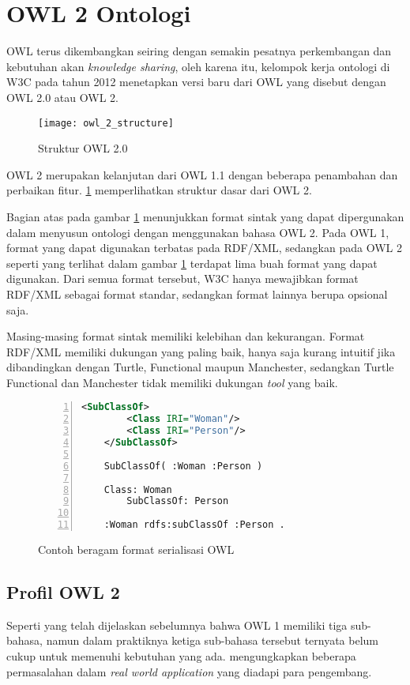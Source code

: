 \section{OWL 2 Ontologi}
OWL terus dikembangkan seiring dengan semakin pesatnya perkembangan dan kebutuhan akan \emph{knowledge sharing}, oleh karena itu, kelompok kerja ontologi di W3C pada tahun 2012 menetapkan versi baru dari OWL yang disebut dengan OWL 2.0 atau OWL 2.

\begin{figure}[ht]
	\centering
	\texttt{[image: owl\_2\_structure]}
	\caption{Struktur OWL 2.0}
	\label{fig:owl_2_structure}
\end{figure}

OWL 2 merupakan kelanjutan dari OWL 1.1 dengan beberapa penambahan dan perbaikan fitur. \ref{fig:owl_2_structure} memperlihatkan struktur dasar dari OWL 2.

Bagian atas pada gambar \ref{fig:owl_2_structure} menunjukkan format sintak yang dapat dipergunakan dalam menyusun ontologi dengan menggunakan bahasa OWL 2. Pada OWL 1, format yang dapat digunakan terbatas pada RDF/XML, sedangkan pada OWL 2 seperti yang terlihat dalam gambar \ref{fig:owl_2_structure} terdapat lima buah format yang dapat digunakan. Dari semua format tersebut, W3C hanya mewajibkan format RDF/XML sebagai format standar, sedangkan format lainnya berupa opsional saja.

Masing-masing format sintak memiliki kelebihan dan kekurangan. Format RDF/XML memiliki dukungan yang paling baik, hanya saja kurang intuitif jika dibandingkan dengan Turtle, Functional maupun Manchester, sedangkan Turtle Functional dan Manchester tidak memiliki dukungan \emph{tool} yang baik.

\begin{figure}[tb]
	\centering
	\begin{lstlisting}[language=XML, numbers=left]
	<SubClassOf>
		<Class IRI="Woman"/>
		<Class IRI="Person"/>
	</SubClassOf>

	SubClassOf( :Woman :Person )

	Class: Woman
		SubClassOf: Person

	:Woman rdfs:subClassOf :Person .
	\end{lstlisting}
	\caption{Contoh beragam format serialisasi OWL}
	\label{fig:owl_serialization_formats}
\end{figure}

\subsection{Profil OWL 2}
Seperti yang telah dijelaskan sebelumnya bahwa OWL 1 memiliki tiga sub-bahasa, namun dalam praktiknya ketiga sub-bahasa tersebut ternyata belum cukup untuk memenuhi kebutuhan yang ada. \citet{patel} mengungkapkan beberapa permasalahan dalam \emph{real world application} yang diadapi para pengembang.

